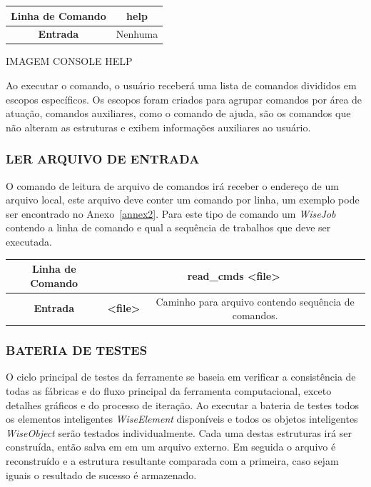 \documentclass[
        english,			
        brazil			        %
        ,<...>]{abntbibufjf}
\begin{document}
\begin{center}
	\begin{tabular}{|c|c|}
		\hline
		\textbf{Linha de Comando} & help \\
		\hline
		\textbf{Entrada} & Nenhuma \\
		\hline
	\end{tabular}
\end{center}

IMAGEM CONSOLE HELP

Ao executar o comando, o usuário receberá uma lista de comandos divididos em escopos específicos. Os escopos foram criados para agrupar comandos por área de atuação, comandos auxiliares, como o comando de ajuda, são os comandos que não alteram as estruturas e exibem informações auxiliares ao usuário.


\subsubsection{LER ARQUIVO DE ENTRADA}\label{sec:read_cmds}


O comando de leitura de arquivo de comandos irá receber o endereço de um arquivo local, este arquivo deve conter um comando por linha, um exemplo pode ser encontrado no Anexo~\ref{annex2}. Para este tipo de comando um \textit{WiseJob} contendo a linha de comando e qual a sequência de trabalhos que deve ser executada.

\begin{center}
	\begin{tabular}{|c|c|c|}
		\hline
		\textbf{Linha de Comando} & \multicolumn{2}{c}{read_cmds <file>} \\
		\hline
		\textbf{Entrada} & \textbf{<file>} & Caminho para arquivo contendo sequência de comandos. \\
		\hline
	\end{tabular}
\end{center}

\subsubsection{BATERIA DE TESTES}\label{sec:test}

O ciclo principal de testes da ferramente se baseia em verificar a consistência de todas as fábricas e do fluxo principal da ferramenta computacional, exceto detalhes gráficos e do processo de iteração. Ao executar a bateria de testes todos os elementos inteligentes \textit{WiseElement} disponíveis e todos os objetos inteligentes \textit{WiseObject} serão testados individualmente. Cada uma destas estruturas irá ser construída, então salva em em um arquivo externo. Em seguida o arquivo é reconstruído e a estrutura resultante comparada com a primeira, caso sejam iguais o resultado de sucesso é armazenado.
\end{document}
